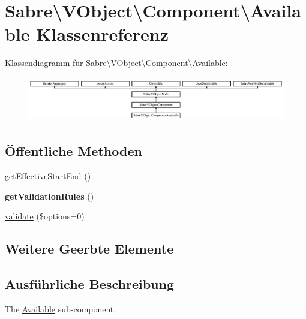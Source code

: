 \hypertarget{class_sabre_1_1_v_object_1_1_component_1_1_available}{}\section{Sabre\textbackslash{}V\+Object\textbackslash{}Component\textbackslash{}Available Klassenreferenz}
\label{class_sabre_1_1_v_object_1_1_component_1_1_available}
Klassendiagramm für Sabre\textbackslash{}V\+Object\textbackslash{}Component\textbackslash{}Available\+:\begin{figure}[H]
\begin{center}
\leavevmode
\includegraphics[height=1.964912cm]{class_sabre_1_1_v_object_1_1_component_1_1_available}
\end{center}
\end{figure}
\subsection*{Öffentliche Methoden}
\begin{DoxyCompactItemize}
\item 
\mbox{\hyperlink{class_sabre_1_1_v_object_1_1_component_1_1_available_a4590a817c682aa722c326ca1717f9266}{get\+Effective\+Start\+End}} ()
\item 
\mbox{\label{class_sabre_1_1_v_object_1_1_component_1_1_available_aaceec7d2953a2a9d17e8312f0172ad25}} 
{\bfseries get\+Validation\+Rules} ()
\item 
\mbox{\hyperlink{class_sabre_1_1_v_object_1_1_component_1_1_available_abaedf6fbced847ec3fb3af9cabdbfa35}{validate}} (\$options=0)
\end{DoxyCompactItemize}
\subsection*{Weitere Geerbte Elemente}


\subsection{Ausführliche Beschreibung}
The \mbox{\hyperlink{class_sabre_1_1_v_object_1_1_component_1_1_available}{Available}} sub-\/component.

